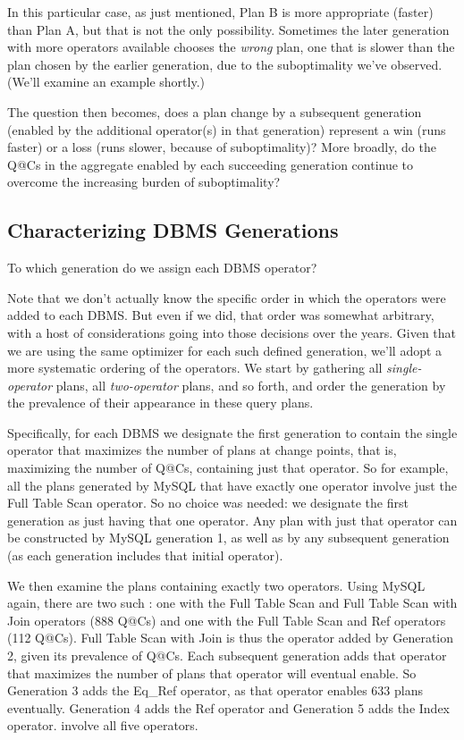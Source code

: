 \documentclass[prodmode,acmtods]{acmsmall}
\begin{document}
In this particular case, as just mentioned, Plan B is more appropriate (faster) than Plan A,
but that is not the only possibility. Sometimes the later generation with
more operators available chooses the {\em wrong} plan, one that is slower
than the plan chosen by the earlier generation, due to the suboptimality
we've observed. (We'll examine an example shortly.)

The question then becomes, does a plan change by a subsequent generation
(\hbox{enabled} by the additional operator(s) in that generation) represent a win (runs faster)
or a loss (runs slower, because of suboptimality)? More broadly, do the Q@Cs
in the aggregate enabled by each succeeding generation continue to overcome
the increasing burden of suboptimality?

\subsection{Characterizing \hbox{DBMS} Generations}
To which generation do we assign each \hbox{DBMS} operator?

Note that we don't actually know the specific order in which the operators
were added to each \hbox{DBMS}. But even if we did, that order was somewhat
arbitrary, with a host of considerations going into those decisions over the
years. Given that we are using the same optimizer for each such defined
generation, we'll adopt a more systematic ordering of the operators. We
start by gathering all {\em single-operator} plans, all {\em two-operator} plans,
and so forth, and order the generation by the prevalence of their
\hbox{appearance} in these query plans.

Specifically, for each \hbox{DBMS} we designate the first
generation to contain the single operator that maximizes the number of plans
at change points, that is, maximizing the number of Q@Cs, containing just that
operator. So for example, all the plans generated by MySQL that have exactly
one operator involve just the Full Table Scan operator.  So no choice was
needed: we designate the
first generation as just having that one operator. Any plan with just that
operator can be constructed by MySQL generation 1, as well as by any
subsequent generation (as each generation includes that initial operator).

We then examine the plans containing exactly two operators.
Using MySQL again, there are two such : one with the Full Table Scan and
Full Table Scan with Join operators (888 Q@Cs) and
one with the Full Table Scan and Ref operators (112 Q@Cs). Full
Table Scan with Join is thus the operator added by Generation 2, given its
prevalence of Q@Cs. Each
subsequent generation adds that operator that maximizes the number of plans
that operator will eventual enable. So Generation 3 adds the Eq\_Ref operator,
as that operator enables 633 plans eventually. Generation 4 adds the Ref
operator and Generation 5 adds the Index operator. 
involve all five operators.
\end{document}

